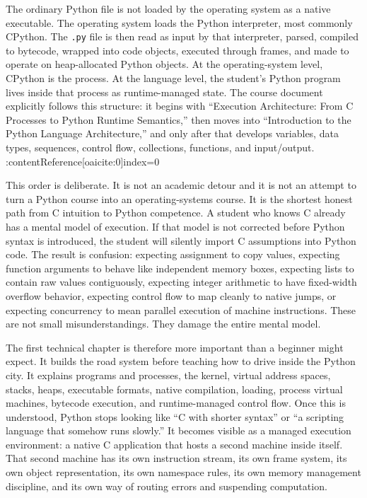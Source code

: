 \documentclass[a4paper,twoside]{report}
\begin{document}
The ordinary Python file is not loaded by the operating system as a native executable. The operating system loads the Python interpreter, most commonly CPython. The \texttt{.py} file is then read as input by that interpreter, parsed, compiled to bytecode, wrapped into code objects, executed through frames, and made to operate on heap-allocated Python objects. At the operating-system level, CPython is the process. At the language level, the student’s Python program lives inside that process as runtime-managed state. The course document explicitly follows this structure: it begins with “Execution Architecture: From C Processes to Python Runtime Semantics,” then moves into “Introduction to the Python Language Architecture,” and only after that develops variables, data types, sequences, control flow, collections, functions, and input/output. :contentReference[oaicite:0]{index=0}

This order is deliberate. It is not an academic detour and it is not an attempt to turn a Python course into an operating-systems course. It is the shortest honest path from C intuition to Python competence. A student who knows C already has a mental model of execution. If that model is not corrected before Python syntax is introduced, the student will silently import C assumptions into Python code. The result is confusion: expecting assignment to copy values, expecting function arguments to behave like independent memory boxes, expecting lists to contain raw values contiguously, expecting integer arithmetic to have fixed-width overflow behavior, expecting control flow to map cleanly to native jumps, or expecting concurrency to mean parallel execution of machine instructions. These are not small misunderstandings. They damage the entire mental model.

The first technical chapter is therefore more important than a beginner might expect. It builds the road system before teaching how to drive inside the Python city. It explains programs and processes, the kernel, virtual address spaces, stacks, heaps, executable formats, native compilation, loading, process virtual machines, bytecode execution, and runtime-managed control flow. Once this is understood, Python stops looking like “C with shorter syntax” or “a scripting language that somehow runs slowly.” It becomes visible as a managed execution environment: a native C application that hosts a second machine inside itself. That second machine has its own instruction stream, its own frame system, its own object representation, its own namespace rules, its own memory management discipline, and its own way of routing errors and suspending computation.
\end{document}
